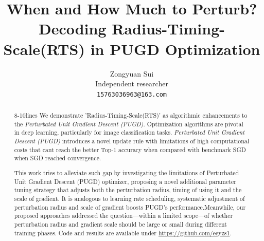 \documentclass[10pt,twocolumn,letterpaper]{article}
\newcommand{\todo}[1]{\textcolor{red}{#1}}
\begin{document}
\setlength{\abovedisplayskip}{5pt}
\setlength{\belowdisplayskip}{5pt}
\setlength{\abovedisplayskip}{5pt}
\setlength{\belowdisplayskip}{5pt}


\title{When and How Much to Perturb? Decoding Radius-Timing-Scale(RTS) in PUGD Optimization}

\author{Zongyuan Sui\\
Independent researcher\\
{\tt\small 15763036963@163.com}
}

\maketitle
\thispagestyle{empty}

\begin{abstract} 8-10lines
We demonstrate 'Radius-Timing-Scale(RTS)' as algorithmic enhancements to the \textit{Perturbated Unit Gradient Descent (PUGD)}.
Optimization algorithms are pivotal in deep learning, particularly for image classification tasks. \textit{Perturbated Unit Gradient Descent (PUGD)} \cite{Tseng_2022} introduces a novel update rule with limitations of high computational costs that cant reach the better Top-1 accuracy when compared with benchmark SGD when SGD reached convergence. 

This work tries to alleviate such gap by investigating the limitations of Perturbated Unit Gradient Descent (PUGD) optimizer, proposing a novel additional parameter tuning strategy that adjusts both the perturbation radius, timing of using it and the scale of gradient. It is analogous to learning rate scheduling, systematic adjustment of perturbation radius and scale of gradient boosts PUGD's performance.Meanwhile, our proposed approaches addressed the question—within a limited scope—of whether perturbation radius and gradient scale should be large or small during different training phases. Code and results are available under \url{https://github.com/eeyzs1}.
\end{abstract}
\vspace{-1.25em}
\end{document}
